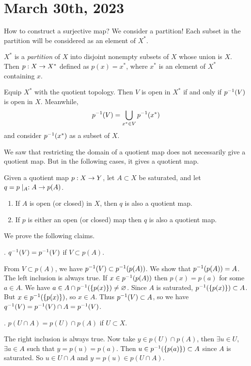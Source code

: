 \section*{March 30th, 2023}

How to construct a surjective map? We consider a partition! Each subset in the partition will be considered as an element of \(X^*\).

\(X^*\) is a \textit{partition} of \(X\) into disjoint nonempty subsets of \(X\) whose union is \(X\). Then \(p: X \rightarrow X^*\) defined as \(p(x) = x^*\), where \(x^*\) is an element of \(X^*\) containing \(x\).

Equip \(X^*\) with the quotient topology. Then \(V\) is open in \(X^*\) if and only if \(p^{-1}(V)\) is open in \(X\). Meanwhile,
\[
    p^{-1}(V) = \bigcup_{x^* \in V} p^{-1}(x^*)
\]
and consider \(p^{-1}(x^*)\)  as a subset of \(X\).

We saw that restricting the domain of a quotient map does not necessarily give a quotient map. But in the following cases, it gives a quotient map.

 Given a quotient map \(p : X \rightarrow Y\), let \(A \subset X\) be saturated, and let \(q = p \mid_A : A \rightarrow p(A)\).
\begin{enumerate}
    \item If \(A\) is open (or closed) in \(X\), then \(q\) is also a quotient map.
    \item If \(p\) is either an open (or closed) map then \(q\) is also a quotient map.
\end{enumerate}

\pf We prove the following claims.

\quad \claim. \(q^{-1}(V) = p^{-1}(V)\) if \(V \subset p(A)\).

\quad \pf From \(V \subset p(A)\), we have \(p^{-1}(V) \subset p^{-1}(p(A))\). We show that \(p^{-1}(p(A)) = A\). The left inclusion is always true. If \(x \in p^{-1}(p(A))\) then \(p(x) = p(a)\) for some \(a \in A\). We have \(a \in A \cap p^{-1}(\{p(x)\}) \neq \varnothing\). Since \(A\) is saturated, \(p^{-1}(\{p(x)\}) \subset A\). But \(x \in p^{-1}(\{p(x)\})\), so \(x \in A\). Thus \(p^{-1}(V) \subset A\), so we have \(q^{-1}(V) = p^{-1}(V) \cap A = p^{-1}(V)\).

\quad \claim. \(p(U \cap A) = p(U) \cap p(A)\) if \(U \subset X\).

\quad \pf The right inclusion is always true. Now take \(y \in p(U) \cap p(A)\), then \(\exists u \in U\), \(\exists a \in A\) such that \(y = p(u) = p(a)\). Then \(u \in p^{-1}(\{p(a)\}) \subset A\) since \(A\) is saturated. So \(u \in U \cap A\) and \(y = p(u) \in p(U\cap A)\).

